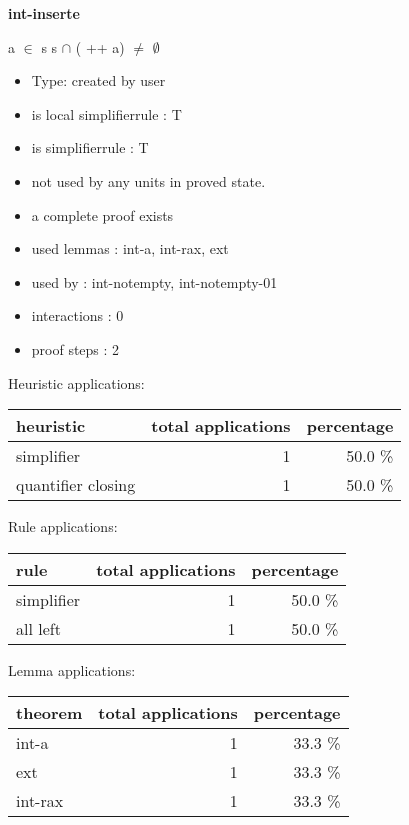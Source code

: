\documentclass[a4paper]{article}
\begin{document}
{\LARGE\bf int-inserte}\label{lemma-int-inserte}

\medskip

 \Fol a $\in$ s \Imp s $\cap$ ( ++ a) $\neq$ $\emptyset$

\begin{itemize}

\item Type: created by user

\item is local simplifierrule : T
\item is simplifierrule : T
\item not used by any units in proved state.
\item       a complete proof exists
\item       used lemmas  : int-a, int-rax, ext
\item       used by      : int-notempty, int-notempty-01
\item       interactions : 0
\item       proof steps  : 2
\end{itemize}

\medskip


Heuristic applications:

\begin{supertabular}{l|r|r}
heuristic	& total applications & percentage \\ \hline
simplifier & 1 & 50.0 \% \\
quantifier closing & 1 & 50.0 \% \\

\end{supertabular}

Rule applications:

\begin{supertabular}{l|r|r}
rule	        & total applications & percentage \\ \hline
simplifier & 1 & 50.0 \% \\
all left & 1 & 50.0 \% \\

\end{supertabular}

Lemma applications:

\begin{supertabular}{l|r|r}
theorem	        & total applications & percentage \\ \hline
int-a & 1 & 33.3 \% \\
ext & 1 & 33.3 \% \\
int-rax & 1 & 33.3 \% \\

\end{supertabular}
\pagebreak
\end{document}
